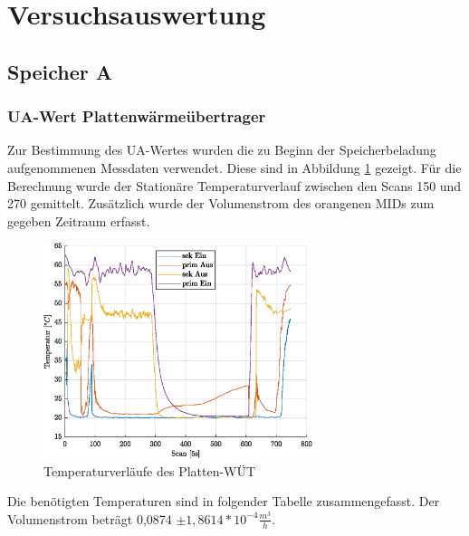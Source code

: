 \section{Versuchsauswertung}

\subsection{Speicher A}

\subsubsection{UA-Wert Plattenwärmeübertrager}
Zur Bestimmung des UA-Wertes wurden die zu Beginn der Speicherbeladung aufgenommenen Messdaten verwendet. Diese sind in Abbildung \ref{fig:extWT} gezeigt. Für die Berechnung wurde der Stationäre Temperaturverlauf zwischen den Scans 150 und 270 gemittelt. Zusätzlich wurde der Volumenstrom des orangenen MIDs zum gegeben Zeitraum erfasst. 

\begin{figure}[H]
	\centering
	\includegraphics[width=0.7\textwidth]{../DATA/PlattenWT_A.eps}
	\caption[Temperaturverläufe des Platten-WÜT]{Temperaturverläufe des Platten-WÜT}
	\label{fig:extWT}
\end{figure}

Die benötigten Temperaturen sind in folgender Tabelle zusammengefasst. Der Volumenstrom beträgt 0,0874 $\pm1,8614*10^{-4} \frac{m^3}{h}$.


